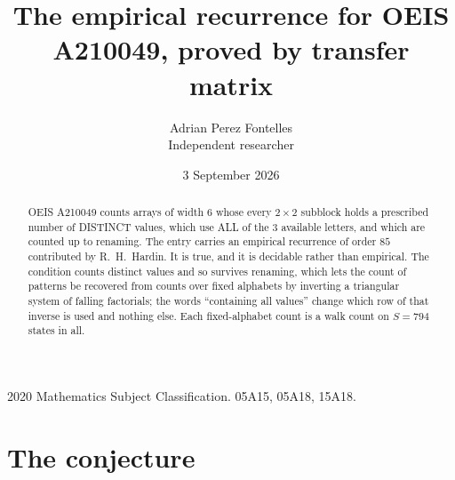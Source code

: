 \documentclass[11pt,a4paper]{article}
\title{The empirical recurrence for OEIS A210049, proved by transfer matrix}
\author{Adrian Perez Fontelles\\ \small Independent researcher}
\date{3 September 2026}
\theoremstyle{plain}
\theoremstyle{definition}
\begin{document}
\maketitle

\begin{abstract}
OEIS A210049 counts arrays of width $6$ whose every $2\times2$ subblock holds a
prescribed number of DISTINCT values, which use ALL of the $3$ available letters, and which
are counted up to renaming. The entry carries an empirical recurrence of order $85$
contributed by R.~H.~Hardin. It is true, and it is decidable rather than empirical. The
condition counts distinct values and so survives renaming, which lets the count of patterns be
recovered from counts over fixed alphabets by inverting a triangular system of falling
factorials; the words ``containing all values'' change which row of that inverse is used and
nothing else. Each fixed-alphabet count is a walk count on $S=794$ states in all.
\end{abstract}

\noindent\small 2020 Mathematics Subject Classification. 05A15, 05A18, 15A18.\normalsize

\section{The conjecture}
\end{document}
